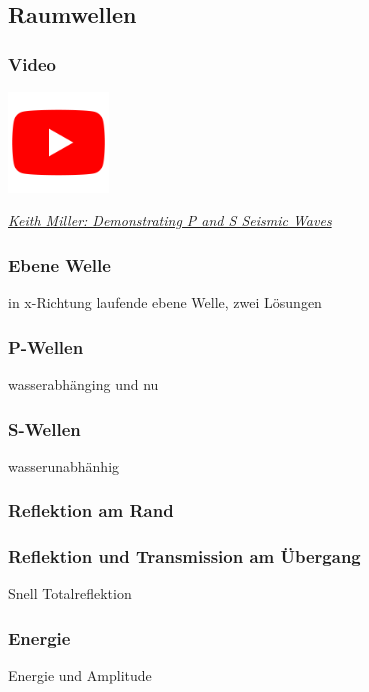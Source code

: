 \subsection{Raumwellen}

\begin{frame}
\frametitle{Video}
\begin{center}
\includegraphics[width=0.2\textwidth]{fig_img/youtube.png}   
\end{center}


\href{https://www.youtube.com/watch?v=gjRGIpP-Qfw}{\textsl{Keith Miller: Demonstrating P and S Seismic Waves}}

\end{frame}


\begin{frame}
\frametitle{Ebene Welle}
in x-Richtung laufende ebene Welle, zwei Lösungen
\end{frame}


\begin{frame}
\frametitle{P-Wellen}
wasserabhänging und nu
\end{frame}


\begin{frame}
\frametitle{S-Wellen}
wasserunabhänhig
\end{frame}


\begin{frame}
\frametitle{Reflektion am Rand}

\end{frame}


\begin{frame}
\frametitle{Reflektion und Transmission am Übergang}
Snell
Totalreflektion
\end{frame}

\begin{frame}
\frametitle{Energie}
Energie und Amplitude
\end{frame}


